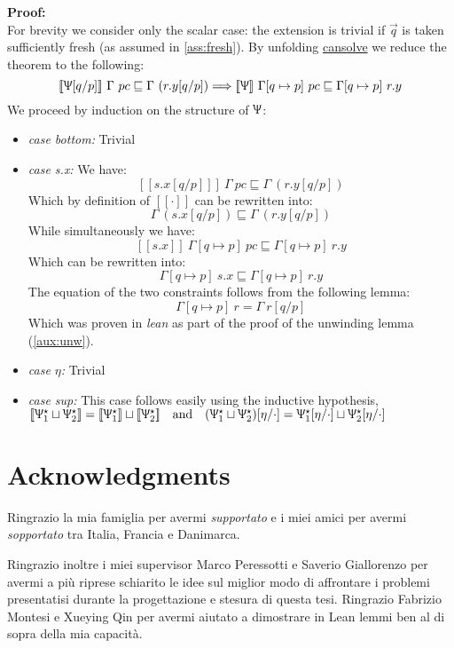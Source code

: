 \documentclass[12pt,a4paper,twoside]{book}
\newcommand{\llbracket}{[\![}
\newcommand{\rrbracket}{]\!]}
\begin{document}
\begin{appendices}
\noindent\textbf{Proof:}\\
For brevity we consider only the scalar case: the extension is trivial if $\vec{q}$ is taken sufficiently fresh (as assumed in \ref{ass:fresh}). By unfolding \underline{cansolve} we reduce the theorem to the following:
$$
\llbracket \Uppsi[q/p]\rrbracket~\Gamma~pc \sqsubseteq \Gamma~(r.y[q/p])
\Longrightarrow \llbracket \Uppsi\rrbracket~\Gamma[q\mapsto p]~pc \sqsubseteq \Gamma[q\mapsto p]~r.y
$$
We proceed by induction on the structure of $\Uppsi$:
\begin{itemize}
\item \emph{case bottom:} Trivial
\item \emph{case s.x:} We have:
$$
\llbracket s.x[q/p]\rrbracket~\Gamma~pc \sqsubseteq \Gamma~(r.y[q/p])
$$
Which by definition of $\llbracket \cdot \rrbracket$ can be rewritten into:
$$
\Gamma~(s.x[q/p]) \sqsubseteq \Gamma~(r.y[q/p])
$$
While simultaneously we have:
$$
\llbracket s.x\rrbracket~\Gamma[q\mapsto p]~pc \sqsubseteq \Gamma[q\mapsto p]~r.y
$$
Which can be rewritten into:
$$
\Gamma[q\mapsto p]~s.x \sqsubseteq \Gamma[q\mapsto p]~r.y
$$
The equation of the two constraints follows from the following lemma:
$$
\Gamma[q\mapsto p]~r = \Gamma~r[q/p]
$$
Which was proven in \emph{lean} as part of the proof of the unwinding lemma (\ref{aux:unw}).

\item \emph{case $\eta$:} Trivial
\item \emph{case sup:} This case follows easily using the inductive hypothesis,\\
$\llbracket \Uppsi_1^\star \sqcup \Uppsi_2^\star \rrbracket = 
\llbracket \Uppsi_1^\star \rrbracket \sqcup \llbracket \Uppsi_2^\star \rrbracket \quad\text{and}\quad
(\Uppsi_1^\star \sqcup \Uppsi_2^\star)[\eta/\cdot]= 
\Uppsi_1^\star [\eta/\cdot]\sqcup \Uppsi_2^\star[\eta/\cdot]$
\end{itemize}

\end{appendices}





\chapter*{Acknowledgments}
Ringrazio la mia famiglia per avermi \emph{supportato} e i miei amici per avermi \emph{sopportato} tra Italia, Francia e Danimarca.

\noindent Ringrazio inoltre i miei supervisor Marco Peressotti e Saverio Giallorenzo per avermi a più riprese schiarito le idee sul miglior modo di affrontare i problemi presentatisi durante la progettazione e stesura di questa tesi.
Ringrazio Fabrizio Montesi e Xueying Qin per avermi aiutato a dimostrare in Lean lemmi ben al di sopra della mia capacità.
\end{document}

